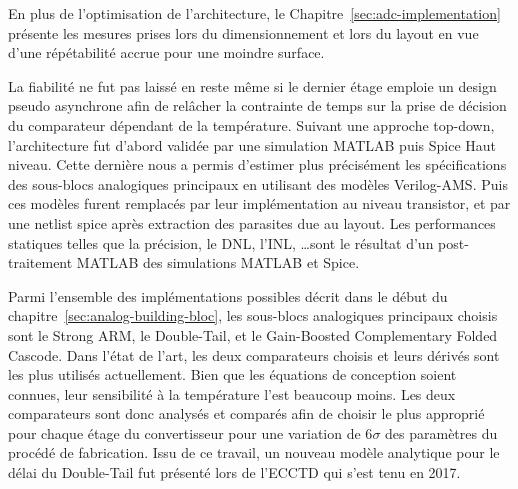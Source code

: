 \begin{mdframed}[linecolor=Prune,linewidth=1]
    En plus de l'optimisation de l'architecture, le Chapitre~\ref{sec:adc-implementation} présente les mesures prises lors du dimensionnement et lors du layout en vue d'une répétabilité accrue pour une moindre surface.
    
    La fiabilité ne fut pas laissé en reste même si le dernier étage emploie un design pseudo asynchrone afin de relâcher la contrainte de temps sur la prise de décision du comparateur dépendant de la température. Suivant une approche top-down, l'architecture fut d'abord validée par une simulation MATLAB puis Spice Haut niveau. Cette dernière nous a permis d'estimer plus précisément les spécifications des sous-blocs analogiques principaux en utilisant des modèles Verilog-AMS\@. Puis ces modèles furent remplacés par leur implémentation au niveau transistor, et par une netlist spice après extraction des parasites due au layout. Les performances statiques telles que la précision, le DNL, l'INL, \ldots sont le résultat d'un post-traitement MATLAB des simulations MATLAB et Spice.
    
    Parmi l'ensemble des implémentations possibles décrit dans le début du chapitre~\ref{sec:analog-building-bloc}, les sous-blocs analogiques principaux choisis sont le Strong ARM, le Double-Tail, et le Gain-Boosted Complementary Folded Cascode. Dans l'état de l'art, les deux comparateurs choisis et leurs dérivés sont les plus utilisés actuellement. Bien que les équations de conception soient connues, leur sensibilité à la température l'est beaucoup moins. Les deux comparateurs sont donc analysés et comparés afin de choisir le plus approprié pour chaque étage du convertisseur pour une variation de 6$\sigma$ des paramètres du procédé de fabrication. Issu de ce travail, un nouveau modèle analytique pour le délai du Double-Tail fut présenté lors de l'ECCTD qui s'est tenu en 2017.
    

\end{mdframed}
